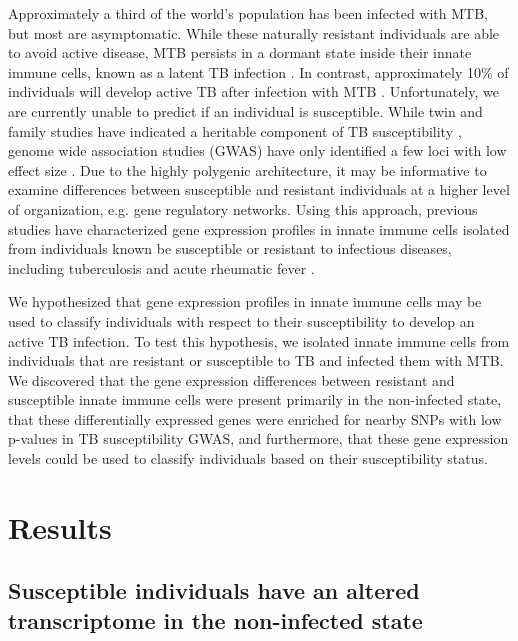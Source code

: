 Approximately a third of the world’s population has been infected with
MTB, but most are asymptomatic. While these naturally resistant
individuals are able to avoid active disease, MTB persists in a
dormant state inside their innate immune cells, known as a latent TB
infection \citep{Munoz2015}. In contrast, approximately 10\% of
individuals will develop active TB after infection with MTB
\citep{North2004, OGarra2013}. Unfortunately, we are currently unable
to predict if an individual is susceptible. While twin and family
studies have indicated a heritable component of TB susceptibility
\citep{Kallmann1943, Comstock1978, Cobat2010, Moller2010}, genome wide
association studies (GWAS) have only identified a few loci with low
effect size \citep{Thye2010, Mahasirimongkol2012, Thye2012, Png2012,
Chimusa2014, Curtis2015, Sobota2016}. Due to the highly polygenic
architecture, it may be informative to examine differences between
susceptible and resistant individuals at a higher level of
organization, e.g. gene regulatory networks. Using this approach,
previous studies have characterized gene expression profiles in innate
immune cells isolated from individuals known be susceptible or
resistant to infectious diseases, including tuberculosis
\citep{Thuong2008} and acute rheumatic fever \citep{Bryant2014}.

We hypothesized that gene expression profiles in innate immune cells
may be used to classify individuals with respect to their
susceptibility to develop an active TB infection. To test this
hypothesis, we isolated innate immune cells from individuals that are
resistant or susceptible to TB and infected them with MTB. We
discovered that the gene expression differences between resistant and
susceptible innate immune cells were present primarily in the
non-infected state, that these differentially expressed genes were
enriched for nearby SNPs with low p-values in TB susceptibility GWAS,
and furthermore, that these gene expression levels could be used to
classify individuals based on their susceptibility status.

\section{Results}

\subsection{Susceptible individuals have an altered transcriptome in the non-infected state}

